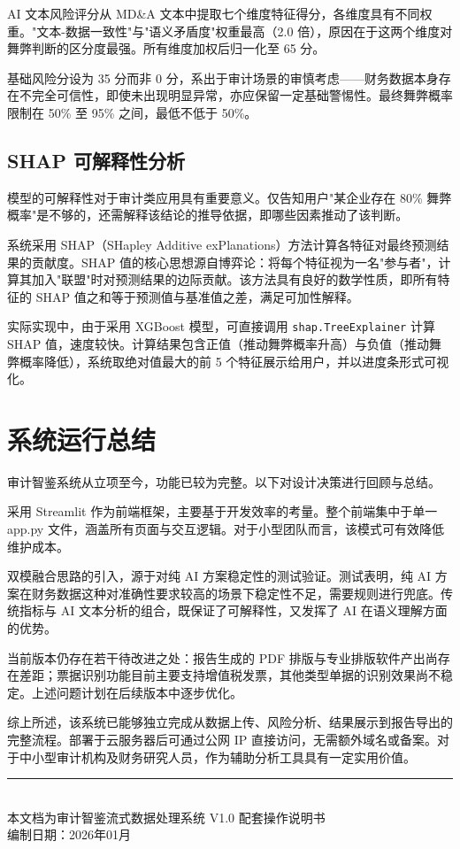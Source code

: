 \documentclass[12pt,a4paper]{ctexart}
\begin{document}
AI 文本风险评分从 MD\&A 文本中提取七个维度特征得分，各维度具有不同权重。"文本-数据一致性"与"语义矛盾度"权重最高（2.0 倍），原因在于这两个维度对舞弊判断的区分度最强。所有维度加权后归一化至 65 分。

基础风险分设为 35 分而非 0 分，系出于审计场景的审慎考虑——财务数据本身存在不完全可信性，即使未出现明显异常，亦应保留一定基础警惕性。最终舞弊概率限制在 50\% 至 95\% 之间，最低不低于 50\%。

\subsection{SHAP 可解释性分析}

模型的可解释性对于审计类应用具有重要意义。仅告知用户"某企业存在 80\% 舞弊概率"是不够的，还需解释该结论的推导依据，即哪些因素推动了该判断。

系统采用 SHAP（SHapley Additive exPlanations）方法计算各特征对最终预测结果的贡献度。SHAP 值的核心思想源自博弈论：将每个特征视为一名"参与者"，计算其加入"联盟"时对预测结果的边际贡献。该方法具有良好的数学性质，即所有特征的 SHAP 值之和等于预测值与基准值之差，满足可加性解释。

实际实现中，由于采用 XGBoost 模型，可直接调用 \texttt{shap.TreeExplainer} 计算 SHAP 值，速度较快。计算结果包含正值（推动舞弊概率升高）与负值（推动舞弊概率降低），系统取绝对值最大的前 5 个特征展示给用户，并以进度条形式可视化。

\newpage

\section{系统运行总结}

审计智鉴系统从立项至今，功能已较为完整。以下对设计决策进行回顾与总结。

采用 Streamlit 作为前端框架，主要基于开发效率的考量。整个前端集中于单一 app.py 文件，涵盖所有页面与交互逻辑。对于小型团队而言，该模式可有效降低维护成本。

双模融合思路的引入，源于对纯 AI 方案稳定性的测试验证。测试表明，纯 AI 方案在财务数据这种对准确性要求较高的场景下稳定性不足，需要规则进行兜底。传统指标与 AI 文本分析的组合，既保证了可解释性，又发挥了 AI 在语义理解方面的优势。

当前版本仍存在若干待改进之处：报告生成的 PDF 排版与专业排版软件产出尚存在差距；票据识别功能目前主要支持增值税发票，其他类型单据的识别效果尚不稳定。上述问题计划在后续版本中逐步优化。

综上所述，该系统已能够独立完成从数据上传、风险分析、结果展示到报告导出的完整流程。部署于云服务器后可通过公网 IP 直接访问，无需额外域名或备案。对于中小型审计机构及财务研究人员，作为辅助分析工具具有一定实用价值。

\vspace{2cm}
\begin{center}
\rule{0.6\textwidth}{0.4pt}\\[0.5em]
{\small 本文档为审计智鉴流式数据处理系统 V1.0 配套操作说明书}\\
{\small 编制日期：2026年01月}
\end{center}
\end{document}

